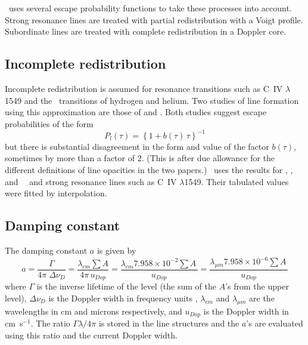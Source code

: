 \Cloudy\ uses several escape probability functions to take these processes
into account.
Strong resonance lines are treated with partial redistribution
with a Voigt profile.
Subordinate lines are treated with complete
redistribution in a Doppler core.

\subsection{Incomplete redistribution }

Incomplete redistribution is assumed for resonance transitions such as
C~IV $\lambda$1549 and the \la\ transitions of hydrogen and helium.  Two studies of
line formation using this approximation are those of \citet{Bonihala1979}
and \citet{Hummer1980}.
Both studies suggest escape probabilities of the form
\begin{equation}
{P_l}(\tau ) = {\left\{ {1 + b\left( \tau  \right)\,\tau } \right\}^{
- 1}}%
\end{equation}
but there is substantial disagreement in the form and value of the factor
$b(\tau)$, sometimes by more than a factor of 2.
(This is after due allowance
for the different definitions of line opacities in the two papers.)  \Cloudy\
uses the \citet{Hummer1980} results for \hi, \hei, and \heii\ \la\ and
strong resonance lines such as C~IV $\lambda$1549.
Their tabulated values were fitted
by interpolation.

\subsection{Damping constant }

The damping constant $a$ is given by
\begin{equation}
a = \frac{\Gamma }{{4\pi \;\Delta {\nu _D}}} = \frac{{{\lambda _{cm}}\sum
A }}{{4\pi \,{u_{Dop}}}} = \frac{{{\lambda _{cm}}7.958 \times {{10}^{ -
2}}\sum {A\,} }}{{{u_{Dop}}}} = \frac{{{\lambda _{\mu m}}7.958 \times {{10}^{
- 6}}\sum {A\,} }}{{{u_{Dop}}}}%
\end{equation}
where $\Gamma$ is the inverse lifetime of the level
(the sum of the $A$'s from the
upper level), $\Delta {\nu _D}$
is the Doppler width in frequency units \citep{Mihalas1978},
$\lambda_{cm}$ and $\lambda_{\mu m}$ are
the wavelengths in cm and microns respectively,
and $u_{Dop}$ is the Doppler width in cm~s$^{-1}$.
The ratio $\Gamma \lambda /4\pi $
is stored in the line structures and the $a$'s are evaluated
using this ratio
and the current Doppler width.

